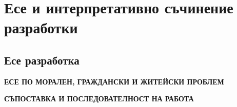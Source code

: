 \documentclass[12pt,a4paper]{article}
\begin{document}
\section{Есе и интерпретативно съчинение разработки}
\subsection{Есе разработка}

\begin{center}
\textbf{
ЕСЕ ПО МОРАЛЕН, ГРАЖДАНСКИ И ЖИТЕЙСКИ ПРОБЛЕМ
}

\vspace{0.1cm}

\textbf{
СЪПОСТАВКА И ПОСЛЕДОВАТЕЛНОСТ НА РАБОТА
}
\end{center}

\vspace{-0.5cm}

\end{document}
